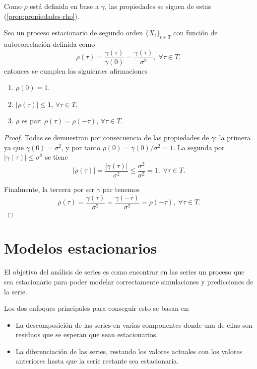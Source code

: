 Como $\rho$ está definida en base a $\gamma$, las propiedades se siguen de estas (\autoref{prop:propiedades-rho}).

\begin{proposicion}
  Sea un proceso estacionario de segundo orden $\{X_t\}_{t \in T}$ con función de autocorrelación definida como
  $$\rho(\tau) = \dfrac{\gamma(\tau)}{\gamma(0)} = \dfrac{\gamma(\tau)}{\sigma^2}, \; \forall \tau \in T,$$
  entonces se cumplen las siguientes afirmaciones
  \begin{enumerate}
    \item $\rho(0) = 1$.
    \item $|\rho(\tau)| \leq 1, \, \forall \tau \in T$.
    \item $\rho$ es par: $\rho(\tau) = \rho(-\tau), \, \forall \tau \in T$.
  \end{enumerate}
  \label{prop:propiedades-rho}
\end{proposicion}

\begin{proof}
  Todas se demuestran por consecuencia de las propiedades de $\gamma$: la primera ya que $\gamma(0) = \sigma^2$, y por tanto $\rho(0) = \gamma(0) / \sigma^2 = 1$. La segunda por $|\gamma(\tau)| \leq \sigma^2$ se tiene
  $$|\rho(\tau)| = \dfrac{|\gamma(\tau)|}{\sigma^2} \leq \dfrac{\sigma^2}{\sigma^2} = 1, \; \forall \tau \in T.$$

  Finalmente, la tercera por ser $\gamma$ par tenemos
  $$\rho(\tau) = \dfrac{\gamma(\tau)}{\sigma^2} = \dfrac{\gamma(-\tau)}{\sigma^2} = \rho(-\tau), \; \forall \tau \in T.$$
\end{proof}

\section{Modelos estacionarios}

El objetivo del análisis de series es como encontrar en las series un proceso que sea estacionario para poder modelar correctamente simulaciones y predicciones de la serie.

Los dos enfoques principales para conseguir esto se basan en:

\begin{itemize}
  \item La descomposición de las series en varias componentes donde una de ellas son residuos que se esperan que sean estacionarios.
  \item La diferenciación de las series, restando los valores actuales con los valores anteriores hasta que la serie restante sea estacionaria.
\end{itemize}

